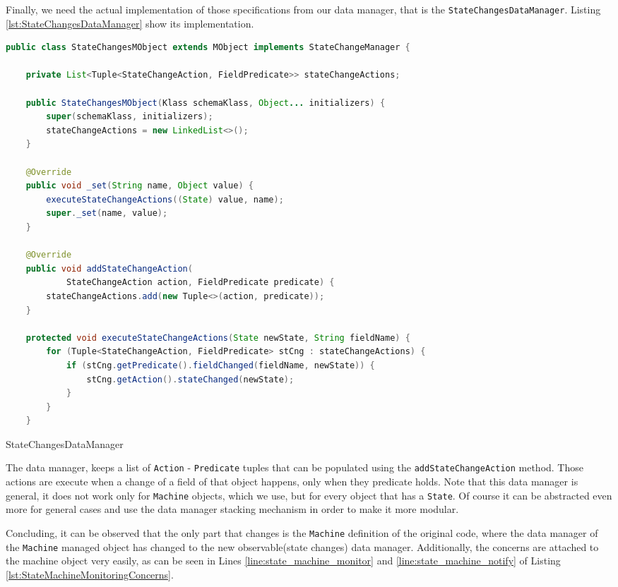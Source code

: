 Finally, we need the actual implementation of those specifications from our data manager, that is the \texttt{StateChangesDataManager}. Listing \ref{lst:StateChangesDataManager} show its implementation.

\begin{sourcecode} [H]
	\begin{lstlisting}[language=Java, escapechar=|]
public class StateChangesMObject extends MObject implements StateChangeManager {

	private List<Tuple<StateChangeAction, FieldPredicate>> stateChangeActions;

	public StateChangesMObject(Klass schemaKlass, Object... initializers) {
		super(schemaKlass, initializers);
		stateChangeActions = new LinkedList<>();
	}

	@Override
	public void _set(String name, Object value) {
		executeStateChangeActions((State) value, name);
		super._set(name, value);
	}

	@Override
	public void addStateChangeAction(
			StateChangeAction action, FieldPredicate predicate) {
		stateChangeActions.add(new Tuple<>(action, predicate));
	}

	protected void executeStateChangeActions(State newState, String fieldName) {
		for (Tuple<StateChangeAction, FieldPredicate> stCng : stateChangeActions) {
			if (stCng.getPredicate().fieldChanged(fieldName, newState)) {
				stCng.getAction().stateChanged(newState);
			}
		}
	}
	\end{lstlisting}
	\caption{StateChangesDataManager}
	\label{lst:StateChangesDataManager}
\end{sourcecode} 

The data manager, keeps a list of \texttt{Action} - \texttt{Predicate} tuples that can be populated using the \texttt{addStateChangeAction} method.
Those actions are execute when a change of a field of that object happens, only when they predicate holds.
Note that this data manager is general, it does not work only for \texttt{Machine} objects, which we use, but for every object that has a \texttt{State}.
Of course it can be abstracted even more for general cases and use the data manager stacking mechanism in order to make it more modular.

Concluding, it can be observed that the only part that changes is the \texttt{Machine} definition of the original code, where the data manager of the \texttt{Machine} managed object has changed to the new observable(state changes) data manager.
Additionally, the concerns are attached to the machine object very easily, as can be seen in Lines \ref{line:state_machine_monitor} and \ref{line:state_machine_notify} of Listing \ref{lst:StateMachineMonitoringConcerns}.

